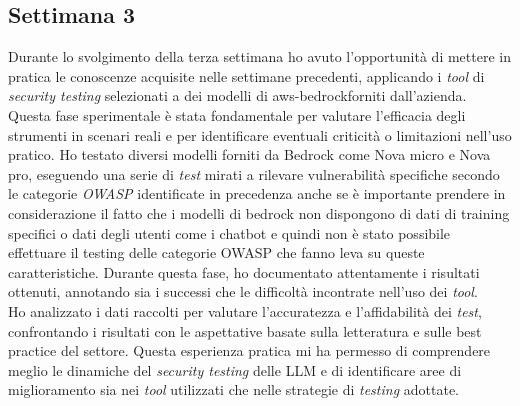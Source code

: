 \subsection{Settimana 3}
Durante lo svolgimento della terza settimana ho avuto l'opportunità di mettere in pratica le conoscenze acquisite nelle settimane precedenti, applicando i \emph{tool} di \emph{security testing} selezionati a dei modelli di \gls{aws-bedrock}\glsfirstoccur forniti dall'azienda. Questa fase sperimentale è stata fondamentale per valutare l'efficacia degli strumenti in scenari reali e per identificare eventuali criticità o limitazioni nell'uso pratico. Ho testato diversi modelli forniti da Bedrock come Nova micro e Nova pro, eseguendo una serie di \emph{test} mirati a rilevare vulnerabilità specifiche secondo le categorie \emph{OWASP} identificate in precedenza anche se è importante prendere in considerazione il fatto che i modelli di bedrock non dispongono di dati di training specifici o dati degli utenti come i chatbot e quindi non è stato possibile effettuare il testing delle categorie OWASP che fanno leva su queste caratteristiche. Durante questa fase, ho documentato attentamente i risultati ottenuti, annotando sia i successi che le difficoltà incontrate nell'uso dei \emph{tool}.\\
Ho analizzato i dati raccolti per valutare l'accuratezza e l'affidabilità dei \emph{test}, confrontando i risultati con le aspettative basate sulla letteratura e sulle best practice del settore. Questa esperienza pratica mi ha permesso di comprendere meglio le dinamiche del \emph{security testing} delle LLM e di identificare aree di miglioramento sia nei \emph{tool} utilizzati che nelle strategie di \emph{testing} adottate.  


